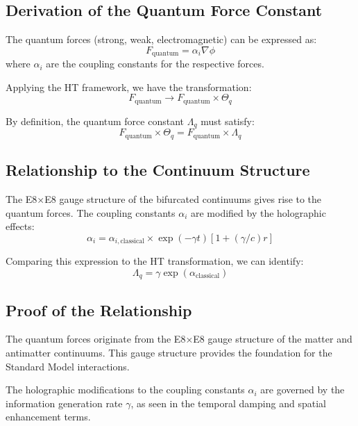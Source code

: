 \documentclass{article}
\theoremstyle{plain}
\theoremstyle{definition}
\theoremstyle{remark}
\begin{document}
\subsection{Derivation of the Quantum Force Constant}

The quantum forces (strong, weak, electromagnetic) can be expressed as:
\begin{equation}
F_\text{quantum} = \alpha_i \nabla \phi
\end{equation}
where $\alpha_i$ are the coupling constants for the respective forces.

Applying the HT framework, we have the transformation:
\begin{equation}
F_\text{quantum} \rightarrow F_\text{quantum} \times \Theta_q
\end{equation}

By definition, the quantum force constant $\Lambda_q$ must satisfy:
\begin{equation}
F_\text{quantum} \times \Theta_q = F_\text{quantum} \times \Lambda_q
\end{equation}

\subsection{Relationship to the Continuum Structure}

The E8×E8 gauge structure of the bifurcated continuums gives rise to the quantum forces. The coupling constants $\alpha_i$ are modified by the holographic effects:
\begin{equation}
\alpha_i = \alpha_{i,\text{classical}} \times \exp(-\gamma t)\left[1 + (\gamma/c)r\right]
\end{equation}

Comparing this expression to the HT transformation, we can identify:
\begin{equation}
\Lambda_q = \gamma \exp(\alpha_\text{classical})
\end{equation}



\subsection{Proof of the Relationship}

The quantum forces originate from the E8×E8 gauge structure of the matter and antimatter continuums. This gauge structure provides the foundation for the Standard Model interactions.

The holographic modifications to the coupling constants $\alpha_i$ are governed by the information generation rate $\gamma$, as seen in the temporal damping and spatial enhancement terms.
\end{document}
